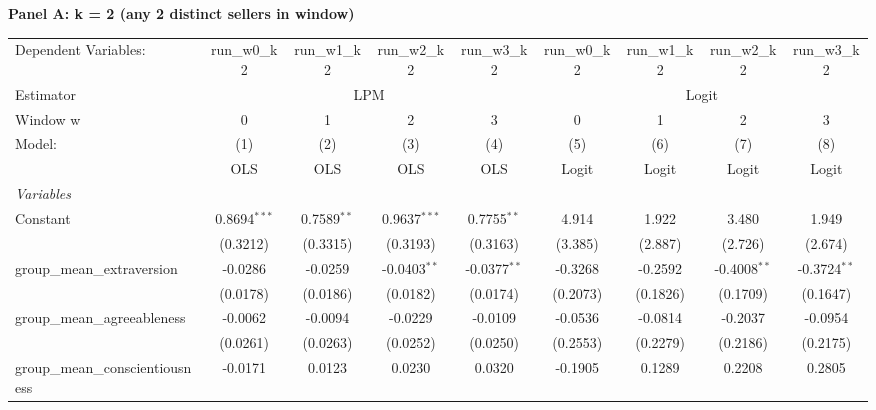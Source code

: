 \textbf{Panel A: k = 2 (any 2 distinct sellers in window)}\\
\begingroup
\centering
\scriptsize
\begin{tabular}{lcccccccc}
   \tabularnewline \midrule \midrule
   Dependent Variables:             & run\_w0\_k2     & run\_w1\_k2     & run\_w2\_k2     & run\_w3\_k2     & run\_w0\_k2    & run\_w1\_k2    & run\_w2\_k2    & run\_w3\_k2\\    
   Estimator & \multicolumn{4}{c}{LPM} & \multicolumn{4}{c}{Logit} \\ 
   Window w                         & 0               & 1               & 2               & 3               & 0              & 1              & 2              & 3 \\   
   Model:                           & (1)             & (2)             & (3)             & (4)             & (5)            & (6)            & (7)            & (8)\\  
                                    &  OLS            & OLS             & OLS             & OLS             & Logit          & Logit          & Logit          & Logit\\  
   \midrule
   \emph{Variables}\\
   Constant                         & 0.8694$^{***}$  & 0.7589$^{**}$   & 0.9637$^{***}$  & 0.7755$^{**}$   & 4.914          & 1.922          & 3.480          & 1.949\\   
                                    & (0.3212)        & (0.3315)        & (0.3193)        & (0.3163)        & (3.385)        & (2.887)        & (2.726)        & (2.674)\\   
   group\_mean\_extraversion        & -0.0286         & -0.0259         & -0.0403$^{**}$  & -0.0377$^{**}$  & -0.3268        & -0.2592        & -0.4008$^{**}$ & -0.3724$^{**}$\\   
                                    & (0.0178)        & (0.0186)        & (0.0182)        & (0.0174)        & (0.2073)       & (0.1826)       & (0.1709)       & (0.1647)\\   
   group\_mean\_agreeableness       & -0.0062         & -0.0094         & -0.0229         & -0.0109         & -0.0536        & -0.0814        & -0.2037        & -0.0954\\   
                                    & (0.0261)        & (0.0263)        & (0.0252)        & (0.0250)        & (0.2553)       & (0.2279)       & (0.2186)       & (0.2175)\\   
   group\_mean\_conscientiousness   & -0.0171         & 0.0123          & 0.0230          & 0.0320          & -0.1905        & 0.1289         & 0.2208         & 0.2805\\   

\end{tabular}
